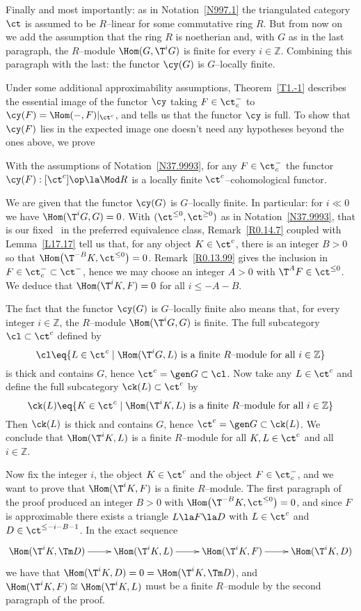 \documentclass[11pt]{amsart}
\newcommand{\zz}{{\mathbb Z}}
\begin{document}
Finally and most importantly: as in Notation~\ref{N997.1} the
triangulated category $\ct$ is assumed to be $R$--linear for some
commutative ring $R$. But from now on we add the assumption that
the ring $R$ is noetherian and, with $G$ as in the last paragraph,
the $R$--module $\Hom(G,\T^iG)$ is finite for every $i\in\zz$.
Combining this paragraph with the last: the functor $\cy(G)$ is $G$--locally
finite.
\entn




Under some additional approximability
assumptions, Theorem~\ref{T1.-1} 
describes the essential image of the functor $\cy$ taking
$F\in\ct^-_c$ to
$\cy(F)=\Hom(-,F)|_{\ct^c}$, and tells us that the functor $\cy$ is full.
To show that $\cy(F)$ lies in the expected image
one doesn't need any hypotheses beyond the ones above, we prove

With the assumptions of Notation~\ref{N37.9993},
for any $F\in\ct^-_c$ the functor $\cy(F):[\ct^c]\op\la\Mod R$
is a locally finite $\ct^c$--cohomological functor.
\elem



\prf
We are given that the functor $\cy(G)$ is $G$--locally
finite.
In particular: for $i\ll0$ we have $\Hom(\T^iG,G)=0$.
With $(\ct^{\leq0},\ct^{\geq0})$ as in
Notation~\ref{N37.9993}, that is our fixed \tstr\ in the
preferred equivalence class, Remark~\ref{R0.14.7} coupled with
Lemma~\ref{L17.17} tell us that, for any object $K\in\ct^c$,
there is an integer $B>0$ so that
$\Hom\big(\T^{-B}K,\ct^{\leq0}\big)=0$. Remark~\ref{R0.13.99}
gives the inclusion in $F\in\ct^-_c\subset\ct^-$, hence we may
choose an integer $A>0$ with $\T^AF\in\ct^{\leq0}$. We deduce
that $\Hom(\T^{i}K,F)=0$ for all $i\leq-A-B$.

The fact that the functor $\cy(G)$ is $G$--locally
finite also means that, for every integer $i\in\zz$,
the $R$--module $\Hom(\T^iG,G)$ is finite. The full subcategory
$\cl\subset\ct^c$ defined by
\[
\cl\eq\{L\in\ct^c\mid\Hom(\T^iG,L)\text{ is a finite $R$--module for all }i\in\zz\}
\]
is thick and contains $G$, hence $\ct^c=\gen G{}\subset\cl$. Now take
any $L\in\ct^c$ and define the full subcategory $\ck(L)\subset\ct^c$ by
\[
\ck(L)\eq\{K\in\ct^c\mid\Hom(\T^iK,L)\text{ is a finite $R$--module for all }i\in\zz\}
\]
Then $\ck(L)$ is thick and contains $G$, hence $\ct^c=\gen G{}\subset\ck(L)$.
We conclude that $\Hom(\T^iK,L)$ is a finite $R$--module for all $K,L\in\ct^c$
and all $i\in\zz$.

Now fix the integer $i$, the object $K\in\ct^c$ and the object $F\in\ct^-_c$,
and we want to prove that
$\Hom(\T^iK,F)$ is a finite $R$--module. The first paragraph of the proof
produced an integer $B>0$ with $\Hom\big(\T^{-B}K,\ct^{\leq0}\big)=0$, and
since $F$ is approximable
there exists a triangle $L\la F\la D$ with $L\in\ct^c$ and
$D\in\ct^{\leq-i-B-1}$.
In the exact sequence
\[\xymatrix{
\Hom(\T^iK,\Tm D)\ar[r] &
\Hom(\T^iK,L)\ar[r] &
\Hom(\T^iK,F)\ar[r] &
\Hom(\T^iK,D)
}\]
we have that
$\Hom(\T^iK,D)=0
=\Hom(\T^iK,\Tm D)$,
and $\Hom(\T^iK,F)\cong \Hom(\T^iK,L)$ must be a finite
$R$--module by the second paragraph of the proof.
\eprf
\end{document}
